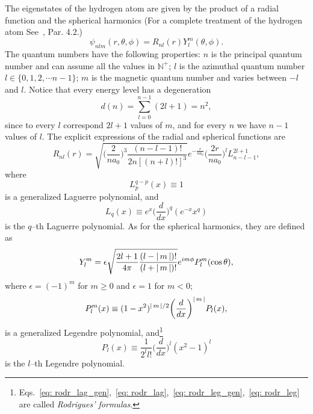 The eigenstates of the hydrogen atom are given by the product of a radial function and the spherical harmonics (For a complete treatment of the hydrogen atom See~\cite{griffiths2018introduction}, Par. 4.2.)
\begin{equation}
    \label{eq: eigenstates_hydrogen_atom}
    \psi_{nlm} (r, \theta, \phi) = R_{nl} (r) Y_l^m (\theta, \phi).
\end{equation}
The quantum numbers have the following properties: $n$ is the principal quantum number and can assume all the values in $\mathbb{N}^+$; $l$ is the azimuthal quantum number $l \in \{ 0, 1, 2, \cdots n-1 \}$; $m$ is the magnetic quantum number and varies between $-l$ and $l$. Notice that every energy level has a degeneration 
\begin{equation}
    \label{eq: degeneration_h_atom}
    d(n) = \sum_{l=0}^{n-1} (2l + 1) = n^2,
\end{equation}
since to every $l$ correspond $2l+1$ values of $m$, and for every $n$ we have $n-1$ values of $l$.
The explicit expressions of the radial and spherical functions are
\begin{equation}
    R_{nl} (r) = \sqrt{\biggl( \frac{2}{n a_0} \biggr)^3 \frac{(n-l-1)!}{2n [(n+l)!]^3}} e^{-\frac{r}{n a_0}} \biggl( \frac{2r}{n a_0} \biggr)^l L_{n-l-1}^{2l+1},
\end{equation}
where 
\begin{equation}
    \label{eq: rodr_lag_gen}
    L_{p}^{q-p} (x) \equiv 1
\end{equation}
is a generalized Laguerre polynomial, and 
\begin{equation}
    \label{eq: rodr_lag}
    L_q (x) \equiv e^x \biggl( \frac{d}{dx} \biggr)^q (e^{-x} x^q)
\end{equation}
is the $q$--th Laguerre polynomial. As for the spherical harmonics, they are defined as
\begin{equation}
    Y_l^m = \epsilon \sqrt{\frac{2l + 1}{4 \pi} \frac{(l - |\, m \,|)!}{(l + |\, m \,|)!}} e^{im \phi} P_l^m (\cos \theta),
\end{equation}
where $\epsilon = (-1)^m$ for $m \ge 0$ and $\epsilon=1$ for $m<0$;
\begin{equation}
    \label{eq: rodr_leg_gen}
    P_l^m (x) \equiv ( 1 - x^2)^{|\, m \,|/2} \biggl( \frac{d}{dx} \biggr)^{|\, m \,|} P_l(x),
\end{equation}
is a generalized Legendre polynomial, and\footnote{Eqs.~\eqref{eq: rodr_lag_gen},~\eqref{eq: rodr_lag},~\eqref{eq: rodr_leg_gen},~\eqref{eq: rodr_leg} are called \textit{Rodrigues' formulas}.} 
\begin{equation}
    \label{eq: rodr_leg}
    P_l(x) \equiv \frac{1}{2^l l!} \biggl( \frac{d}{dx} \biggr)^l (x^2 - 1)^l
\end{equation}
is the $l$--th Legendre polynomial.

